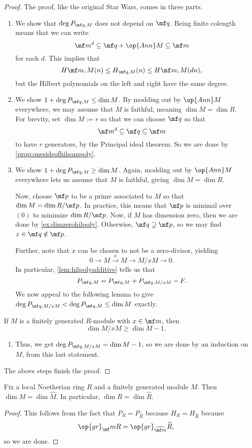 \begin{proof}
	The proof, like the original Star Wars, comes in three parts.
	\begin{enumerate}
		\item We show that $\deg P_{\mf q,M}$ does not depend on $\mf q$. Being finite colength means that we can write
		\[\mf m^d\subseteq\mf q+\op{Ann}M\subseteq\mf m\]
		for each $d$. This implies that
		\[H{\mf m,M}(n)\le H_{\mf q,M}(n)\le H{\mf m,M}(dn),\]
		but the Hilbert polynomials on the left and right have the same degree.
		\item We show $1+\deg P_{\mf q,M}\le\dim M$. By modding out by $\op{Ann}M$ everywhere, we may assume that $M$ is faithful, meaning $\dim M=\dim R$. For brevity, set $\dim M:=r$ so that we can choose $\mf q$ so that
		\[\mf m^d\subseteq\mf q\subseteq\mf m\]
		to have $r$ generators, by the Principal ideal theorem. So we are done by \autoref{prop:onesideofhilsampoly}.
		\item We show $1+\deg P_{\mf q,M}\ge\dim M$. Again, modding out by $\op{Ann}M$ everywhere lets us assume that $M$ is faithful, giving $\dim M=\dim R$.

		Now, choose $\mf p$ to be a prime associated to $M$ so that $\dim M=\dim R/\mf p$. In practice, this means that $\mf p$ is minimal over $(0)$ to minimize $\dim R/\mf p$. Now, if $M$ has dimension zero, then we are done by \autoref{ex:dimzerohilpoly}. Otherwise, $\mf q\supsetneq\mf p$, so we may find $x\in\mf q\notin\mf p$.

		Further, note that $x$ can be chosen to not be a zero-divisor, yielding
		\[0\to M\stackrel x\to M\to M/xM\to0.\]
		In particular, \autoref{lem:hilpolyadditive} tells us that
		\[P_{\mf q,M}=P_{\mf q,M}+P_{\mf q,M/xM}-F.\]
		We now appeal to the following lemma to give $\deg P_{\mf q,M/xM}<\deg P_{\mf q,M}\le\dim M$ exactly.
	\end{enumerate}
	\begin{lemma}
		If $M$ is a finitely generated $R$-module with $x\in\mf m$, then
		\[\dim M/xM\ge\dim M-1.\]
	\end{lemma}
	\begin{enumerate}
		\item[] Thus, we get $\deg P_{\mf q,M/xM}=\dim M-1$, so we are done by an induction on $M$, from this last statement.
	\end{enumerate}
	The above steps finish the proof.
\end{proof}
\begin{corollary}
	Fix a local Noetherian ring $R$ and a finitely generated module $M$. Then $\dim M=\dim\widehat M$. In particular, $\dim R=\dim\widehat R$.
\end{corollary}
\begin{proof}
	This follows from the fact that $P_R=P_{\widehat R}$ because $H_R=H_{\widehat R}$ because
	\[\op{gr}_\mf mR=\op{gr}_{\widehat{\mf m}}\widehat R,\]
	so we are done.
\end{proof}

